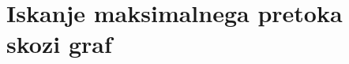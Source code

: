 \documentclass[10pt,a4paper,oneside]{book}
\begin{document}
\section{Iskanje maksimalnega pretoka skozi graf}

\end{document}
